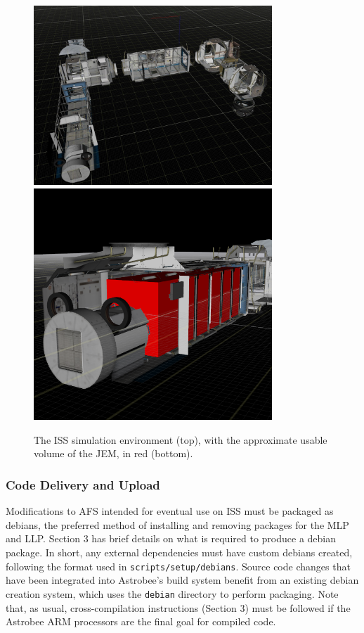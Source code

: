 \documentclass{article}
\begin{document}
\begin{figure}[h!]
	\begin{center}
	\includegraphics[width=0.8\textwidth]{img/ISS_env.jpg}\\
	\vspace{2cm}
	\includegraphics[width=0.8\textwidth]{img/ISS_volume.png}
	\caption{The ISS simulation environment (top), with the approximate usable volume of the JEM, in red (bottom).}
	\end{center}
	\label{fig:iss_jem}
\end{figure}

\subsubsection{Code Delivery and Upload}

Modifications to AFS intended for eventual use on ISS must be packaged as debians, the preferred method of installing and removing packages for the MLP and LLP. Section 3 has brief details on what is required to produce a debian package. In short, any external dependencies must have custom debians created, following the format used in \texttt{scripts/setup/debians}. Source code changes that have been integrated into Astrobee's build system benefit from an existing debian creation system, which uses the \texttt{debian} directory to perform packaging. Note that, as usual, cross-compilation instructions (Section 3) must be followed if the Astrobee ARM processors are the final goal for compiled code.
\end{document}
